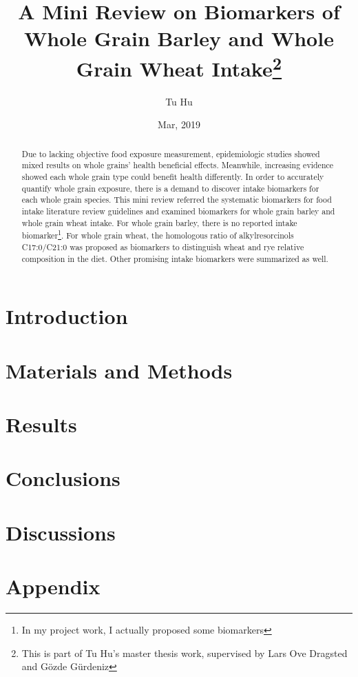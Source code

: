 \documentclass[]{article}
\title{A Mini Review on Biomarkers of Whole Grain Barley and Whole Grain Wheat Intake\footnote{This is part of Tu Hu's master thesis work, supervised by Lars Ove Dragsted and Gözde Gürdeniz}}
\author{Tu Hu}
\date{Mar, 2019}
\begin{document}
\maketitle

\begin{abstract}
Due to lacking objective food exposure measurement, epidemiologic studies showed mixed results on whole grains' health beneficial effects.
Meanwhile, increasing evidence showed each whole grain type could benefit health differently. 
In order to accurately quantify whole grain exposure, there is a demand to discover intake biomarkers for each whole grain species.
This mini review referred the systematic biomarkers for food intake literature review guidelines and examined biomarkers for whole grain barley and whole grain wheat intake.
For whole grain barley, there is no reported intake biomarker\footnote{In my project work, I actually proposed some biomarkers}.
For whole grain wheat, the homologous ratio of alkylresorcinols C17:0/C21:0 was proposed as biomarkers to distinguish wheat and rye relative composition in the diet.
Other promising intake biomarkers were summarized as well.

\end{abstract}

\section{Introduction}


\section{Materials and Methods}


\section{Results}


\section{Conclusions}

\section{Discussions}


\section{Appendix}


\clearpage
\printbibliography[
heading=bibintoc,
title={References}
]
\end{document}
